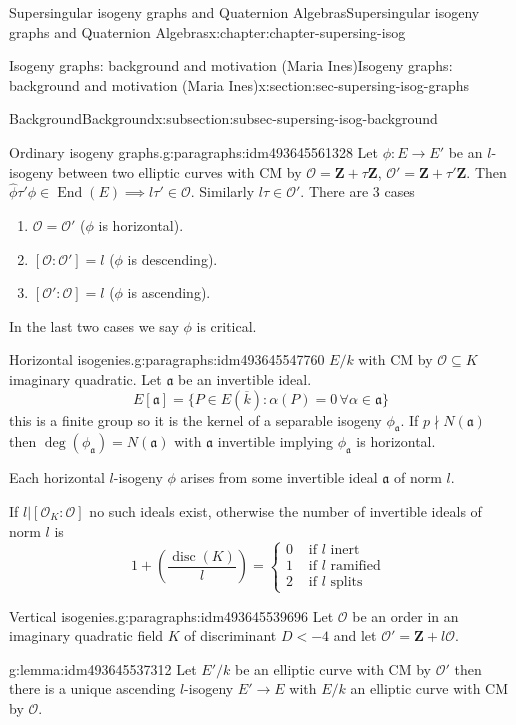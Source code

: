 \documentclass[oneside,10pt,]{book}
\numberwithin{equation}{section}
\newcommand{\ideal}[1]{\mathfrak{#1}}
\newcommand{\lb}{[}
\newcommand{\rb}{]}
\newcommand{\ZZ}{\mathbf{Z}}
\newcommand{\ints}{\mathcal{O}}
\DeclareMathOperator{\End}{End}
\DeclareMathOperator{\disc}{disc}
\newcommand{\lt}{<}
\newcommand{\amp}{&}
\begin{document}
\begin{chapterptx}{Supersingular isogeny graphs and Quaternion Algebras}{}{Supersingular isogeny graphs and Quaternion Algebras}{}{}{x:chapter:chapter-supersing-isog}
\begin{sectionptx}{Isogeny graphs: background and motivation (Maria Ines)}{}{Isogeny graphs: background and motivation (Maria Ines)}{}{}{x:section:sec-supersing-isog-graphs}
\begin{subsectionptx}{Background}{}{Background}{}{}{x:subsection:subsec-supersing-isog-background}
\begin{paragraphs}{Ordinary isogeny graphs.}{g:paragraphs:idm493645561328}
Let \(\phi\colon E\to E'\) be an \(l\)-isogeny between two elliptic curves with CM by \(\ints = \ZZ+\tau\ZZ\), \(\ints ' = \ZZ+\tau'\ZZ\). Then \(\hat\phi \tau' \phi \in \End(E) \implies l\tau ' \in \ints\). Similarly \(l\tau \in \ints'\). There are 3 cases%
\begin{enumerate}
\item{}\(\ints = \ints'\) (\(\phi\) is horizontal).%
\item{}\(\lb\ints : \ints' \rb = l\) (\(\phi\) is descending).%
\item{}\(\lb\ints' : \ints \rb = l\) (\(\phi\) is ascending).%
\end{enumerate}
In the last two cases we say \(\phi\) is critical.%
\end{paragraphs}%
\begin{paragraphs}{Horizontal isogenies.}{g:paragraphs:idm493645547760}%
\(E/k\) with CM by \(\ints \subseteq K\) imaginary quadratic. Let \(\ideal a\) be an invertible ideal.%
\begin{equation*}
E\lb \ideal a \rb = \{ P \in E(\overline k) : \alpha (P)  = 0\, \forall \alpha \in \ideal a\}
\end{equation*}
this is a finite group so it is the kernel of a separable isogeny \(\phi_{\ideal a }\). If \(p \nmid N(\ideal a)\) then \(\deg(\phi_{\ideal a}) = N(\ideal a)\) with \(\ideal a\) invertible implying \(\phi_{\ideal a} \) is horizontal.%
\par
Each horizontal \(l\)-isogeny \(\phi\) arises from some invertible ideal \(\ideal a\) of norm \(l\).%
\par
If \(l | \lb \ints_K : \ints \rb \) no such ideals exist, otherwise the number of invertible ideals of norm \(l\) is%
\begin{equation*}
1+ \left(\frac {\disc(K)}{l}\right) = \begin{cases}0\amp\text{ if }l \text{ inert }\\ 1\amp\text{ if }l \text{ ramified }\\ 2\amp\text{ if }l \text{ splits}\end{cases}
\end{equation*}
%
\end{paragraphs}%
\begin{paragraphs}{Vertical isogenies.}{g:paragraphs:idm493645539696}%
Let \(\ints\) be an order in an imaginary quadratic field \(K \) of discriminant \(D \lt -4\) and let \(\ints' = \ZZ+l\ints\).%
\begin{lemma}{}{}{g:lemma:idm493645537312}%
Let \(E' / k\)  be an elliptic curve with CM by \(\ints '\) then there is a  unique ascending \(l\)-isogeny \(E'\to E\) with \(E/k\) an elliptic curve with CM by \(\ints\).%

\end{lemma}
\end{paragraphs}
\end{subsectionptx}
\end{sectionptx}
\end{chapterptx}
\end{document}
